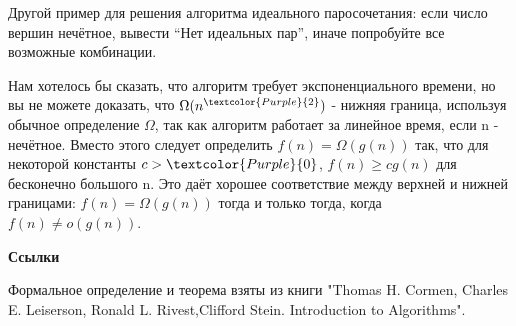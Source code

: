 \vspace{\baselineskip}

Другой пример для решения алгоритма идеального паросочетания: если число вершин нечётное, вывести “Нет идеальных пар”, иначе попробуйте все возможные комбинации.

\vspace{\baselineskip}

Нам хотелось бы сказать, что алгоритм требует экспоненциального времени, но вы не можете доказать, что $\Omega(n^{\textcolor{Purple}{2}})$ - нижняя граница, используя обычное определение $\Omega$, так как алгоритм работает за линейное время, если n - нечётное. Вместо этого следует определить $f(n)=\Omega(g(n))$ так, что для некоторой константы $c>\textcolor{Purple}{0}$, $f(n) \geqslant c g(n)$ для бесконечно большого n. Это даёт хорошее соответствие между верхней и нижней границами: $f(n)=\Omega(g(n))$ тогда и только тогда, когда $f(n) \neq o(g(n))$.

\vspace{\baselineskip}

\textbf{Ссылки}

\vspace{\baselineskip}

Формальное определение и теорема взяты из книги "Thomas H. Cormen, Charles E. Leiserson, Ronald L. Rivest,Clifford Stein. Introduction to Algorithms".
